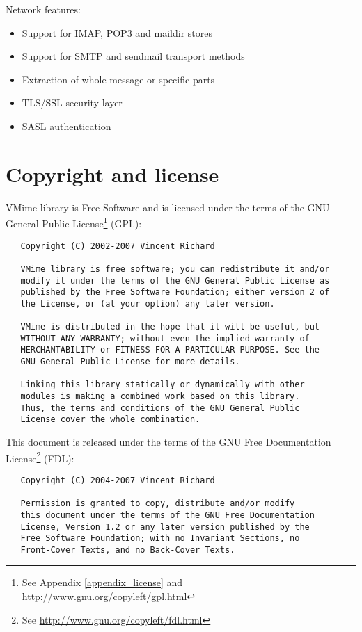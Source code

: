 \noindent Network features:

\begin{itemize}
\item Support for IMAP, POP3 and maildir stores
\item Support for SMTP and sendmail transport methods
\item Extraction of whole message or specific parts
\item TLS/SSL security layer
\item SASL authentication
\end{itemize}


\section{Copyright and license}

VMime library is Free Software and is licensed under the terms of the GNU
General Public License\footnote{See Appendix \ref{appendix_license} and
\url{http://www.gnu.org/copyleft/gpl.html}} (GPL):

\begin{verbatim}
   Copyright (C) 2002-2007 Vincent Richard

   VMime library is free software; you can redistribute it and/or
   modify it under the terms of the GNU General Public License as
   published by the Free Software Foundation; either version 2 of
   the License, or (at your option) any later version.

   VMime is distributed in the hope that it will be useful, but
   WITHOUT ANY WARRANTY; without even the implied warranty of
   MERCHANTABILITY or FITNESS FOR A PARTICULAR PURPOSE. See the
   GNU General Public License for more details.

   Linking this library statically or dynamically with other
   modules is making a combined work based on this library.
   Thus, the terms and conditions of the GNU General Public
   License cover the whole combination.
\end{verbatim}

\newpage
\noindent This document is released under the terms of the
GNU Free Documentation
License\footnote{See \url{http://www.gnu.org/copyleft/fdl.html}} (FDL):

\begin{verbatim}
   Copyright (C) 2004-2007 Vincent Richard

   Permission is granted to copy, distribute and/or modify
   this document under the terms of the GNU Free Documentation
   License, Version 1.2 or any later version published by the
   Free Software Foundation; with no Invariant Sections, no
   Front-Cover Texts, and no Back-Cover Texts.
\end{verbatim}

